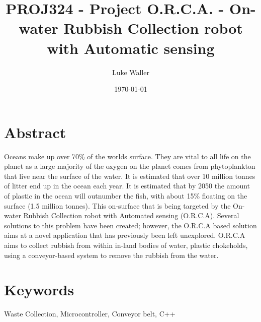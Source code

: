 \documentclass [11pt]{article}
\begin{document}

							
\title{\bf PROJ324 - Project O.R.C.A. - On-water Rubbish Collection robot with Automatic sensing} 	
\author{Luke Waller} 								
\date{\today} 										
\maketitle
\thispagestyle{empty}


\newpage 	

\section*{Abstract}

Oceans make up over 70\% of the worlds surface. They are vital to all life on the planet as a large majority of the oxygen on the planet comes from phytoplankton that live near the surface of the water. It is estimated that over 10 million tonnes of litter end up in the ocean each year. It is estimated that by 2050 the amount of plastic in the ocean will outnumber the fish, with about 15\% floating on the surface (1.5 million tonnes). This on-surface that is being targeted by the On-water Rubbish Collection robot with Automated sensing (O.R.C.A). 
Several solutions to this problem have been created; however, the O.R.C.A based solution aims at a novel application that has previously been left unexplored. O.R.C.A aims to collect rubbish from within in-land bodies of water, plastic chokeholds, using a conveyor-based system to remove the rubbish from the water. 

\section*{Keywords} 
Waste Collection, Microcontroller, Conveyor belt, C++
\end{document}
